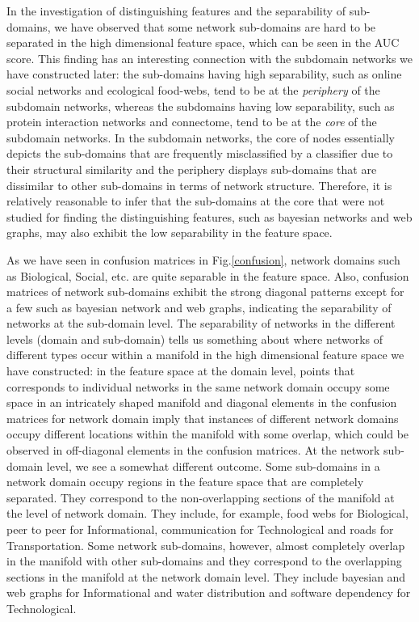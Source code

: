 \documentclass[..]{revtex4}
\begin{document}
In the investigation of distinguishing features and the separability of sub-domains, we have observed that some network sub-domains are hard to be separated in the high dimensional feature space, which can be seen in the AUC score. This finding has an interesting connection with the subdomain networks we have constructed later: the sub-domains having high separability, such as online social networks and ecological food-webs, tend to be at the \textit{periphery} of the subdomain networks, whereas the subdomains having low separability, such as protein interaction networks and connectome, tend to be at the \textit{core} of the subdomain networks. In the subdomain networks, the core of nodes essentially depicts the sub-domains that are frequently misclassified by a classifier due to their structural similarity and the periphery displays sub-domains that are dissimilar to other sub-domains in terms of network structure. Therefore, it is relatively reasonable to infer that the sub-domains at the core that were not studied for finding the distinguishing features, such as bayesian networks and web graphs, may also exhibit the low separability in the feature space. 


 As we have seen in confusion matrices in Fig.\ref{confusion}, network domains such as Biological, Social, etc. are quite separable in the feature space. Also, confusion matrices of network sub-domains exhibit the strong diagonal patterns except for a few such as bayesian network and web graphs, indicating the separability of networks at the sub-domain level. The separability of networks in the different levels (domain and sub-domain) tells us something about where networks of different types occur within a manifold in the high dimensional feature space we have constructed: in the feature space at the domain level, points that corresponds to individual networks in the same network domain occupy some space in an intricately shaped manifold and diagonal elements in the confusion matrices for network domain imply that instances of different network domains occupy different locations within the manifold with some overlap, which could be observed in off-diagonal elements in the confusion matrices. At the network sub-domain level, we see a somewhat different outcome. Some sub-domains in a network domain occupy regions in the feature space that are completely separated. They correspond to the non-overlapping sections of the manifold at the level of network domain. They include, for example, food webs for Biological, peer to peer for Informational, communication for Technological and roads for Transportation. Some network sub-domains, however, almost completely overlap in the manifold with other sub-domains and they correspond to the overlapping sections in the manifold at the network domain level. They include bayesian and web graphs for Informational and water distribution and software dependency for Technological. 
\end{document}
